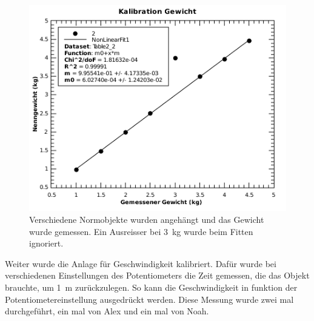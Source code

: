 \begin{figure}[H]
    \centering
    \includegraphics[width=.7\linewidth]{images/kalibration_gewicht}
    \caption{Verschiedene Normobjekte wurden angeh\"angt und das Gewicht wurde gemessen. Ein Ausreisser bei \SI{3}{\kilo\gram} wurde beim Fitten ignoriert.}
    \label{fig:kalibration_gewicht}
\end{figure}

Weiter wurde die Anlage  f\"ur  Geschwindigkeit  kalibriert.  Daf\"ur  wurde bei
verschiedenen Einstellungen des Potentiometers die Zeit gemessen, die das Objekt
brauchte,  um  \SI{1}{\meter} zur\"uckzulegen. So kann  die  Geschwindigkeit  in
funktion der Potentiometereinstellung ausgedr\"uckt werden. Diese Messung  wurde
zwei mal durchgef\"uhrt, ein mal von Alex und ein mal von Noah.

